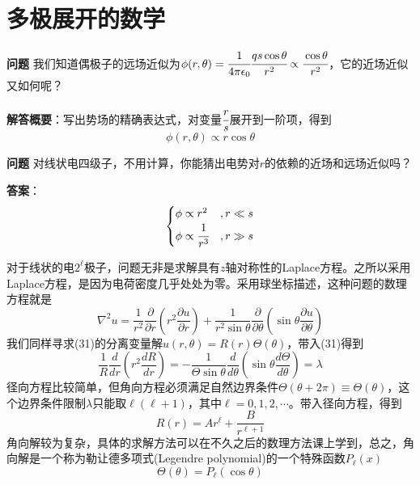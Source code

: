 \documentclass[a4paper,10pt]{ctexart}
\begin{document}
\section{多极展开的数学}
\textbf{问题 }我们知道偶极子的远场近似为$\phi(r,\theta) = \cfrac{1}{4\pi \epsilon_0} \cfrac{qs \cos \theta}{r^2} \propto \cfrac{\cos \theta}{r^2}$，它的近场近似又如何呢？
\par
\textbf{解答概要}：写出势场的精确表达式，对变量$\cfrac{r}{s}$展开到一阶项，得到
\begin{equation}
\phi(r,\theta) \propto r\cos \theta
\end{equation}\par
\textbf{问题 }对线状电四级子，不用计算，你能猜出电势对$r$的依赖的近场和远场近似吗？\par
\textbf{答案}：\begin{equation}
\begin{cases}
\phi \propto r^2 &,r\ll s \\
\phi \propto \cfrac{1}{r^3} &, r\gg s
\end{cases}
\end{equation}
\par
对于线状的电$2^\ell$极子，问题无非是求解具有$z$轴对称性的Laplace方程。之所以采用Laplace方程，是因为电荷密度几乎处处为零。采用球坐标描述，这种问题的数理方程就是
\begin{equation}
\nabla^2 u = \frac{1}{r^2} \frac{\partial}{\partial r} (r^2 \frac{\partial u}{\partial r}) + \frac{1}{r^2 \sin \theta} \frac{\partial}{\partial \theta}(\sin \theta \frac{\partial u}{\partial \theta})
\end{equation}
我们同样寻求(31)的分离变量解$u(r,\theta) = R(r) \varTheta(\theta)$，带入(31)得到
\begin{equation}
\frac{1}{R} \frac{d}{dr}(r^2\frac{dR}{dr}) = -\frac{1}{\varTheta \sin \theta}\frac{d}{d\theta}(\sin \theta \frac{d\varTheta}{d\theta}) = \lambda
\end{equation}
径向方程比较简单，但角向方程必须满足自然边界条件$\varTheta(\theta +2\pi) \equiv \varTheta(\theta)$，这个边界条件限制$\lambda$只能取$\ell (\ell+1)$，其中$\ell =0,1,2,\cdots$。带入径向方程，得到
\begin{equation}
R(r) = Ar^\ell + \frac{B}{r^{\ell +1}}
\end{equation}
角向解较为复杂，具体的求解方法可以在不久之后的数理方法课上学到，总之，角向解是一个称为勒让德多项式(Legendre polynomial)的一个特殊函数$P_\ell(x)$
\begin{equation}
\varTheta(\theta) = P_\ell(\cos \theta)
\end{equation}
\end{document}
